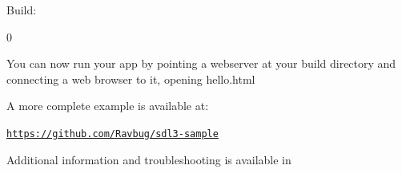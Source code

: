 Build:\+ 
\begin{DoxyCode}{0}

\end{DoxyCode}


You can now run your app by pointing a webserver at your build directory and connecting a web browser to it, opening hello.\+html

A more complete example is available at:\+

\href{https://github.com/Ravbug/sdl3-sample}{\texttt{https:\+/\+/\+github.\+com/\+\+Ravbug/\+sdl3-\/sample}}

Additional information and troubleshooting is available in  